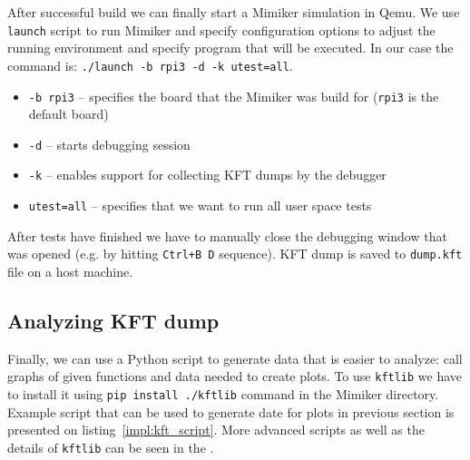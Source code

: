 After successful build we can finally start a Mimiker simulation in Qemu.
We use {\tt launch} script to run Mimiker and specify configuration options to adjust the running environment and specify program that will be executed.
In our case the command is: {\tt ./launch -b rpi3 -d -k utest=all}.

\begin{itemize}
  \item {\tt -b rpi3} -- specifies the board that the Mimiker was build for ({\tt rpi3} is the default board)
  \item {\tt -d} -- starts debugging session
  \item {\tt -k} -- enables support for collecting KFT dumps by the debugger
  \item {\tt utest=all} -- specifies that we want to run all user space tests
\end{itemize}

After tests have finished we have to manually close the debugging window that was opened (e.g. by hitting {\tt Ctrl+B D} sequence).
KFT dump is saved to {\tt dump.kft} file on a host machine.

\subsection{Analyzing KFT dump}

Finally, we can use a Python script to generate data that is easier to analyze: call graphs of given functions and data needed to create plots.
To use {\tt kftlib} we have to install it using \texttt{pip install ./kftlib} command in the Mimiker directory.
Example script that can be used to generate date for plots in previous section is presented on listing~\ref{impl:kft_script}.
More advanced scripts as well as the details of {\tt kftlib} can be seen in the .

